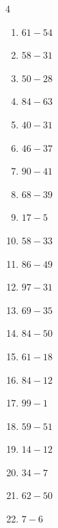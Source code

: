 \begin{multicols}{4}
\begin{enumerate}
  \item $61-54$
        \phantom{$=7$}

  \item $58-31$
        \phantom{$=27$}

  \item $50-28$
        \phantom{$=22$}

  \item $84-63$
        \phantom{$=21$}

  \item $40-31$
        \phantom{$=9$}

  \item $46-37$
        \phantom{$=9$}

  \item $90-41$
        \phantom{$=49$}

  \item $68-39$
        \phantom{$=29$}

  \item $17-5$
        \phantom{$=12$}

  \item $58-33$
        \phantom{$=25$}

  \item $86-49$
        \phantom{$=37$}

  \item $97-31$
        \phantom{$=66$}

  \item $69-35$
        \phantom{$=34$}

  \item $84-50$
        \phantom{$=34$}

  \item $61-18$
        \phantom{$=43$}

  \item $84-12$
        \phantom{$=72$}

  \item $99-1$
        \phantom{$=98$}

  \item $59-51$
        \phantom{$=8$}

  \item $14-12$
        \phantom{$=2$}

  \item $34-7$
        \phantom{$=27$}

  \item $62-50$
        \phantom{$=12$}

  \item $7-6$
        \phantom{$=1$}


\end{enumerate}
\end{multicols}
